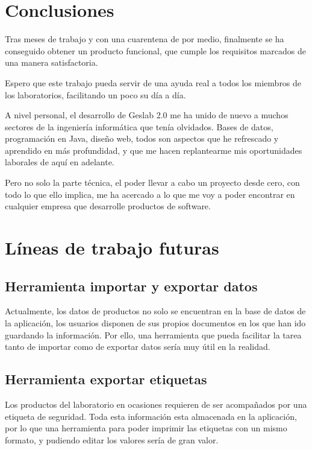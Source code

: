 
\section{Conclusiones}

Tras meses de trabajo y con una cuarentena de por medio, finalmente se ha conseguido obtener un producto funcional, que cumple los requisitos marcados de una manera satisfactoria. 

Espero que este trabajo pueda servir de una ayuda real a todos los miembros de los laboratorios, facilitando un poco su día a día.

A nivel personal, el desarrollo de Geslab 2.0 me ha unido de nuevo a muchos sectores de la ingeniería informática que tenía olvidados. Bases de datos, programación en Java, diseño web, todos son aspectos que he refrescado y aprendido en más profundidad, y que me hacen replantearme mis oportunidades laborales de aquí en adelante.

Pero no solo la parte técnica, el poder llevar a cabo un proyecto desde cero, con todo lo que ello implica, me ha acercado a lo que me voy a poder encontrar en cualquier empresa que desarrolle productos de software.

\section{Líneas de trabajo futuras}

\subsection{Herramienta importar y exportar datos} 
Actualmente, los datos de productos no solo se encuentran en la base de datos de la aplicación, los usuarios disponen de sus propios documentos en los que han ido guardando la información. Por ello, una herramienta que pueda facilitar la tarea tanto de importar como de exportar datos sería muy útil en la realidad.

\subsection{Herramienta exportar etiquetas}
Los productos del laboratorio en ocasiones requieren de ser acompañados por una etiqueta de seguridad. Toda esta información esta almacenada en la aplicación, por lo que una herramienta para poder imprimir las etiquetas con un mismo formato, y pudiendo editar los valores sería de gran valor. 

